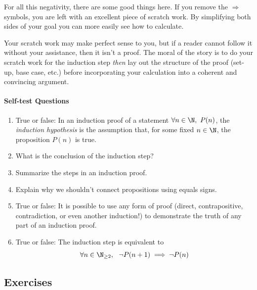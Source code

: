 \noindent For all this negativity, there are some good things here. If you remove the $\Longrightarrow$ symbols, you are left with an excellent piece of scratch work. By simplifying both sides of your goal you can more easily see how to calculate. %

Your scratch work may make perfect sense to you, but if a reader cannot follow it without your assistance, then it isn't a proof. The moral of the story is to do your scratch work for the induction step \emph{then} lay out the structure of the proof (set-up, base case, etc.) before incorporating your calculation into a coherent and convincing argument.

\paragraph{Self-test Questions}

	\begin{enumerate}
	  \item True or false: In an induction proof of a statement $\forall n\in\N,\ P(n)$, the \emph{induction hypothesis} is the assumption that, for some fixed $n\in\N$, the proposition $P(n)$ is true.
	  \item What is the conclusion of the induction step?
	  \item Summarize the steps in an induction proof.
    \item Explain why we shouldn't connect propositions using equals signs.
    \item True or false: It is possible to use any form of proof (direct, contrapositive, contradiction, or even another induction!) to demonstrate the truth of any part of an induction proof.
    \item True or false: The induction step is equivalent to
    \[\forall n\in\N_{\ge 2},\ \ \neg P(n+1)\implies \neg P(n)\]
  \end{enumerate}


\subsection*{Exercises}

